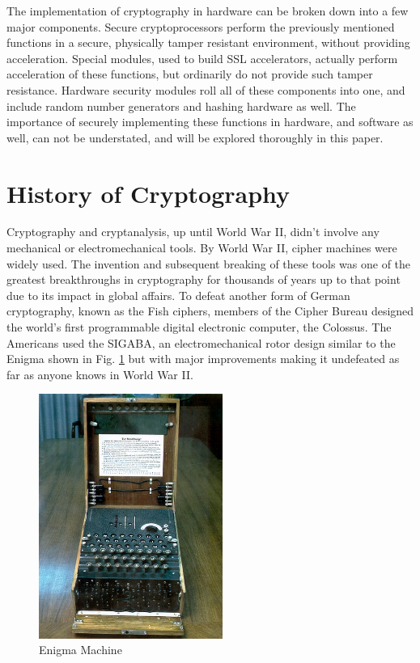 \documentclass[journal]{IEEEtran}
\begin{document}
The implementation of cryptography in hardware can be broken down into a few major components.  Secure cryptoprocessors perform the previously mentioned functions in a secure, physically tamper resistant environment, without providing acceleration.  Special modules, used to build SSL accelerators, actually perform acceleration of these functions, but ordinarily do not provide such tamper resistance.  Hardware security modules roll all of these components into one, and include random number generators and hashing hardware as well.  The importance of securely implementing these functions in hardware, and software as well, can not be understated, and will be explored thoroughly in this paper.


\section{History of Cryptography}

Cryptography and cryptanalysis, up until World War II, didn't involve any mechanical or electromechanical tools.  By World War II, cipher machines were widely used.  The invention and subsequent breaking of these tools was one of the greatest breakthroughs in cryptography for thousands of years up to that point due to its impact in global affairs.  To defeat another form of German cryptography, known as the Fish ciphers, members of the Cipher Bureau designed the world's first programmable digital electronic computer, the Colossus.  The Americans used the SIGABA, an electromechanical rotor design similar to the Enigma shown in Fig. \ref{enigma} but with major improvements making it undefeated as far as anyone knows in World War II.

\begin{figure}[htbp]
	\centering
	\includegraphics[width=6cm,keepaspectratio]{img/enigma.jpg}
	\caption{Enigma Machine \cite{EnigmaRef} }
	\label{enigma}
\end{figure}
\end{document}
